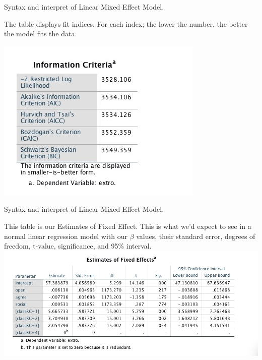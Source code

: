 \documentclass[ignorenonframetext,]{beamer}
\begin{document}
\begin{frame}{Syntax and interpret of Linear Mixed Effect Model.}

The table displays fit indices. For each index; the lower the number,
the better the model fits the data.

\includegraphics{information criteria.jpeg}\\

\end{frame}

\begin{frame}{Syntax and interpret of Linear Mixed Effect Model.}

This table is our Estimates of Fixed Effect. This is what we'd expect to
see in a normal linear regression model with our \(\beta\) values, their
standard error, degrees of freedom, t-value, significance, and 95\%
interval.\\
\includegraphics{estimates of fixed effect.jpeg}\\

\end{frame}
\end{document}
